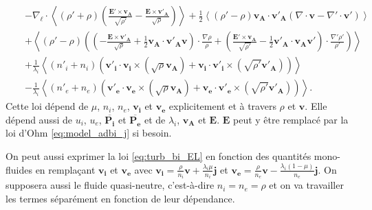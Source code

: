 \begin{equation}
{\begin{array}{lcl}
  &&- \nabla_{\boldsymbol{\ell}} \cdot \left< \left(\rho' + \rho\right) \left(\frac{ \boldsymbol{E'}\times \boldsymbol{v_A} }{\sqrt{\rho'}} - \frac{ \boldsymbol{E}\times \boldsymbol{v'_A} }{\sqrt{\rho}}\right)\right> +  \frac{1}{2}\left<\left(\rho' - \rho\right) \boldsymbol{v_A} \cdot \boldsymbol{v'_{A}} \left(  \nabla \cdot \boldsymbol{v}-  \nabla' \cdot \boldsymbol{v'}\right)\right> \\ %
  &&+ \left<\left(\rho' - \rho\right) \left(\left(-\frac{ \boldsymbol{E}\times \boldsymbol{v'_A} }{\sqrt{\rho}} + \frac{1}{2}\boldsymbol{v_A} \cdot \boldsymbol{v'_{A}} \boldsymbol{v}\right) \cdot \frac{\nabla  \rho }{\rho}+\left(\frac{ \boldsymbol{E'}\times \boldsymbol{v_A} }{\sqrt{\rho'}} - \frac{1}{2}\boldsymbol{v'_A} \cdot \boldsymbol{v_{A}} \boldsymbol{v'}\right) \cdot \frac{\nabla'  \rho' }{\rho'}\right)\right> \\ %
  &&+ \frac{1}{\lambda_i} \left<\left(n'_i + n_i\right)\left(  \boldsymbol{v'_i} \cdot \boldsymbol{v_i} \times \left(\sqrt{\rho}\boldsymbol{v_A}\right) +  \boldsymbol{v_i} \cdot \boldsymbol{v'_i} \times \left( \sqrt{\rho'}\boldsymbol{v'_A}\right)\right) \right> \\ %
  &&- \frac{1}{\lambda_i} \left<\left(n'_e + n_e\right)\left(  \boldsymbol{v'_e} \cdot \boldsymbol{v_e} \times \left(\sqrt{\rho}\boldsymbol{v_A}\right) +  \boldsymbol{v_e} \cdot \boldsymbol{v'_e} \times \left( \sqrt{\rho'}\boldsymbol{v'_A}\right)\right)\right>.
\end{array}}\end{equation} %
Cette loi dépend de  $\mu$, $n_i$, $n_e$, $\boldsymbol{v_i}$ et $\boldsymbol{v_e}$ explicitement et à travers $\rho$ et $\boldsymbol{v}$. Elle dépend aussi de $u_i$, $u_e$, $\overline{\boldsymbol{P_i}}$ et $\overline{\boldsymbol{P_e}}$ et de $\lambda_i$, $\boldsymbol{v_A}$ et $\boldsymbol{E}$. $\boldsymbol{E}$ peut y être remplacé par la loi d'Ohm \eqref{eq:model_adbi_j} si besoin.

On peut aussi exprimer la loi \eqref{eq:turb_bi_EL} en fonction des quantités mono-fluides en remplaçant $\boldsymbol{v_i}$ et $\boldsymbol{v_e}$ avec $\boldsymbol{v_i} = \frac{\rho}{n_i} \boldsymbol{v} + \frac{\lambda_i\mu}{  n_i} \boldsymbol{j}$ et $\boldsymbol{v_e} = \frac{\rho}{n_e} \boldsymbol{v} - \frac{\lambda_i (1-\mu)}{n_e} \boldsymbol{j}$. On supposera aussi le fluide quasi-neutre, c'est-à-dire $n_i = n_e = \rho$ et on va travailler  les termes séparément en fonction de leur dépendance. 

